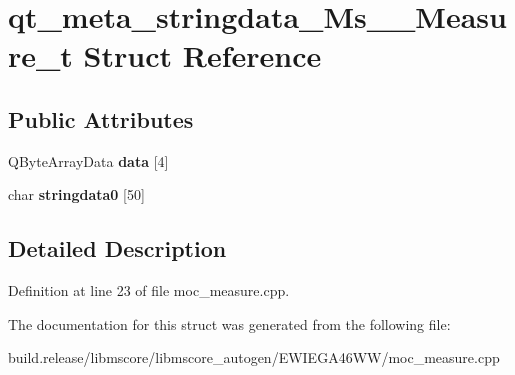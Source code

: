 \hypertarget{structqt__meta__stringdata___ms_____measure__t}{}\section{qt\+\_\+meta\+\_\+stringdata\+\_\+\+Ms\+\_\+\+\_\+\+Measure\+\_\+t Struct Reference}
\label{structqt__meta__stringdata___ms_____measure__t}
\subsection*{Public Attributes}
\begin{DoxyCompactItemize}
\item 
\mbox{\label{structqt__meta__stringdata___ms_____measure__t_a9cbd62c8dfc07505384bb123ea5fb4f0}} 
Q\+Byte\+Array\+Data {\bfseries data} \mbox{[}4\mbox{]}
\item 
\mbox{\label{structqt__meta__stringdata___ms_____measure__t_a72759885c9099437bc8ab2081b9f1728}} 
char {\bfseries stringdata0} \mbox{[}50\mbox{]}
\end{DoxyCompactItemize}


\subsection{Detailed Description}


Definition at line 23 of file moc\+\_\+measure.\+cpp.



The documentation for this struct was generated from the following file\+:\begin{DoxyCompactItemize}
\item 
build.\+release/libmscore/libmscore\+\_\+autogen/\+E\+W\+I\+E\+G\+A46\+W\+W/moc\+\_\+measure.\+cpp\end{DoxyCompactItemize}
